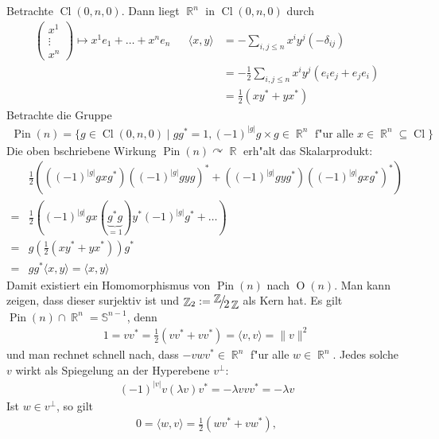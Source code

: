 \documentclass[paper=A4, twoside, chapterprefix=true, bibliography=totoc, headsepline]{scrbook}
\DeclareMathOperator{\R}{\mathbb{R}}
\DeclareMathOperator{\Z}{\mathbb{Z}}
\renewcommand{\S}{\mathbb{S}}
\DeclareMathOperator{\Cl}{Cl}
\DeclareMathOperator{\Pin}{Pin}
\newcommand{\X}{\times}
\newcommand{\FakRaum}[2]{
	\raisebox{0.7ex}{\ensuremath{#1}}
	\ensuremath{\mkern-3mu}\big/\ensuremath{\mkern-3mu}
	\raisebox{-0.6ex}{\ensuremath{#2}}}
\theoremstyle{nonumberbreak}
\theoremstyle{emptybreak}
\theoremstyle{break}
\begin{document}
Betrachte $\Cl(0, n, 0)$.
Dann liegt $\R^n$ in $\Cl(0, n, 0)$ durch
\begin{align*}
	\begin{pmatrix}
		x^1 \\ \vdots \\ x^n
	\end{pmatrix}
	\mapsto
	x^1 e_1 + \ldots + x^n e_n &&
	\langle x, y \rangle
	&= - \sum_{i,j \le n} x^{i} y^j (- \delta_{ij}) \\
	&&&= - \frac{1}{2} \sum_{i, j \le n} x^{i} y^j (e_i e_j + e_j e_i) \\
	&&&= \frac{1}{2} (x y^* + y x^*)
\end{align*}
Betrachte die Gruppe
\begin{align*}
	\Pin(n) = \{ g \in \Cl(0, n, 0) \mid g g^* = 1, (-1)^{|g|} g \X g \in \R^n \text{ f"ur alle } x \in \R^n \subseteq \Cl \}
\end{align*}
Die oben bschriebene Wirkung $\Pin(n) \curvearrowright \R$ erh"alt das Skalarprodukt:
\begin{align*}
	{}& \frac{1}{2} \left( ( (-1)^{|g|} g x g^*) ( (-1)^{|g|} g y g )^* + ( (-1)^{|g|} g y g^* ) ( (-1)^{|g|} g x g^* )^* \right) \\
	={}& \frac{1}{2} \left( (-1)^{|g|} g x (\underbrace{g^* g}_{=1}) y^* (-1)^{|g|} g^* + \ldots \right) \\
	={}& g \left(  \frac{1}{2} (x y^* + y x^*) \right) g^* \\
	={}& g g^* \langle x, y \rangle = \langle x, y \rangle
\end{align*}
Damit existiert ein Homomorphismus von $\Pin(n)$ nach $\mathop{O}(n)$.
Man kann zeigen, dass dieser surjektiv ist und $\Z_2 := \FakRaum{\Z}{2 \Z}$ als Kern hat.
Es gilt $\Pin(n) \cap \R^n = \S^{n-1}$, denn
\begin{align*}
	1 = v v^* = \frac{1}{2} (v v^* + v v^*) = \langle v, v \rangle = \|v\|^2
\end{align*}
und man rechnet schnell nach, dass $-v w v^* \in \R^n$ f"ur alle $w \in \R^n$.
Jedes solche $v$ wirkt als Spiegelung an der Hyperebene $v^\perp$:
\begin{align*}
	(-1)^{|v|} v (\lambda v) v^* = - \lambda v v v^* = -\lambda v
\end{align*}
Ist $w \in v^\perp$, so gilt
\begin{align*}
	0 = \langle w, v \rangle = \frac{1}{2} (w v^* + v w^*),
\end{align*}
\end{document}
